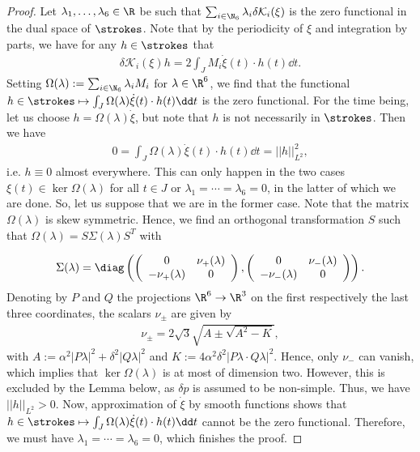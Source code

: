 \begin{proof}
Let $\lambda_1, \dotsc, \lambda_6 \in \R$ be such that $\sum_{i \in \N_6} \lambda_i \delta \mathcal{K}_i(\xi) $ is the zero functional in the dual space of $\strokes$. Note that by the periodicity of $\xi$ and integration by parts, we have for any $h \in \strokes$ that
\begin{align}
	\delta \mathcal{K}_i(\xi) h =  2 \int_J M_i \dot{\xi}(t) \cdot h(t) \dd t.
\end{align}
Setting $\Omega(\lambda) := \sum_{i \in \N_6} \lambda_i M_i$ for $\lambda \in \R^6$, we find that the functional $h \in \strokes \mapsto \int_J \Omega(\lambda) \dot{\xi}(t) \cdot h(t) \dd t$ is the zero functional. For the time being, let us choose $h = \Omega(\lambda) \dot{\xi}$, but note that $h$ is not necessarily in $\strokes$. Then we have
\begin{align}
\label{eq:zero_functional}
	0 = \int_J \Omega(\lambda) \dot{\xi}(t) \cdot h(t) \dd t = ||h||_{L^2}^{2},
\end{align}
i.e. $h \equiv 0$ almost everywhere. This can only happen in the two cases $\xi(t) \in \ker \Omega(\lambda)$ for all $t \in J$ or $\lambda_1 = \dotsm = \lambda_6 = 0$, in the latter of which we are done. So, let us suppose that we are in the former case. Note that the matrix $\Omega(\lambda)$ is skew symmetric. Hence, we find an orthogonal transformation $S$ such that $\Omega(\lambda) = S \Sigma(\lambda) S^T$ with

\begin{align}
\Sigma(\lambda) = \diag \left (\left( \begin{array}{cc}
0 & \nu_+(\lambda) \\ 
- \nu_+ (\lambda) & 0
\end{array} \right ) , \left ( \begin{array}{cc}
0 & \nu_{-}(\lambda) \\ 
- \nu_{-}(\lambda) & 0
\end{array} \right ) \right ).
\end{align}
Denoting by $P$ and $Q$ the projections $\R^6 \to \R^3$ on the first respectively the last three coordinates, the scalars $\nu_{\pm}$ are given by
\begin{align}
	\nu_{\pm} = 2 \sqrt{3} \sqrt{A \pm \sqrt{A^2 - K}},
\end{align}
with $A := \alpha^2 |P \lambda|^2 + \delta^2 |Q \lambda|^2$ and $K := 4 \alpha^2 \delta^2 |P\lambda \cdot Q \lambda|^2$. Hence, only $\nu_-$ can vanish, which implies that $\ker \Omega(\lambda)$ is at most of dimension two. However, this is excluded by the Lemma below, as $\delta p$ is assumed to be non-simple. Thus, we have $||h||_{L^2} > 0$. Now, approximation of $\dot{\xi}$ by smooth functions shows that $h \in \strokes \mapsto \int_J \Omega(\lambda) \dot{\xi}(t) \cdot h(t) \dd t$ cannot be the zero functional. Therefore, we must have $\lambda_1 = \dotsm = \lambda_6 = 0$, which finishes the proof.
\end{proof}

